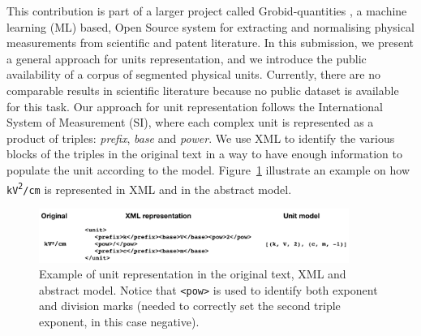 \documentclass[a4j,11pt]{article}
\begin{document}
This contribution is part of a larger project called Grobid-quantities \autocite{grobid-quantities}, a machine learning (ML) based, Open Source system for extracting and normalising physical measurements from scientific and patent literature. 
In this submission, we present a general approach for units representation, and we introduce the public availability of a corpus of segmented physical units. 
Currently, there are no comparable results in scientific literature because no public dataset is available for this task.
Our approach for unit representation follows the International System of Measurement (SI), where each complex unit is represented as a product of triples: \textit{prefix}, \textit{base} and \textit{power}. We use XML to identify the various blocks of the triples in the original text in a way to have enough information to populate the unit according to the model.
Figure~\ref{fig:dataset example} illustrate an example on how \texttt{kV\textsuperscript{2}/cm} is represented in XML and in the abstract model. 
\begin{figure}[h]
    \centering
    \includegraphics[width=0.9\textwidth,natwidth=575,natheight=101]{sample-corpus.png}
    \caption[Example of the dataset] {Example of unit representation in the original text, XML and abstract model. Notice that \texttt{<pow>} is used to identify both exponent and division marks (needed to correctly set the second triple exponent, in this case negative).}
    \label{fig:dataset example}
\end{figure}
\end{document}
